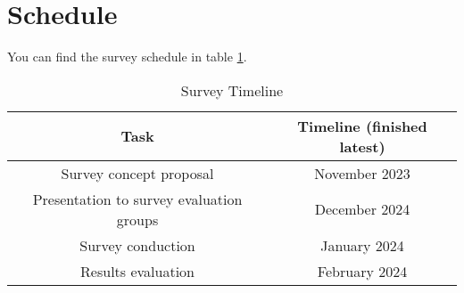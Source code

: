 \documentclass[%
class=scrreprt,
chapterprefix=false,%
open=right,%
twoside=false,%
paper=a4,%
logofile={Logo\_zentral\_farbig\_EN.png},%
thesistype=masterproposal,%
UKenglish,%
]{se2thesis}
\begin{document}


\section{Schedule}
You can find the survey schedule in table \ref{tab:survey-timeline}.

\begin{table}[ht]
	\centering
	\begin{tabular}{|c|c|}
		\hline
		\textbf{Task} & \textbf{Timeline (finished latest)} \\
		\hline
		Survey concept proposal & November 2023 \\
		\hline
		Presentation to survey evaluation groups & December 2024 \\
		\hline
		Survey conduction & January 2024 \\
		\hline
		Results evaluation & February 2024 \\
		\hline
	\end{tabular}
	\caption{Survey Timeline}
	\label{tab:survey-timeline}
\end{table}
\end{document}
